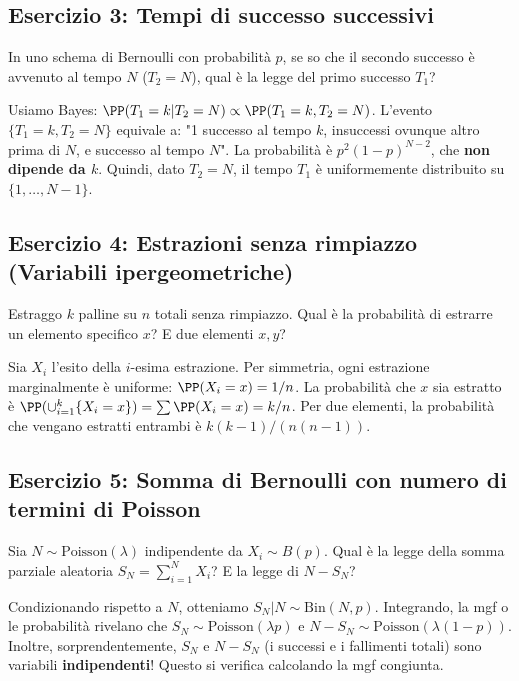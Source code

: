 \subsection*{Esercizio 3: Tempi di successo successivi}
In uno schema di Bernoulli con probabilità $p$, se so che il secondo successo è avvenuto al tempo $N$ ($T_2 = N$), qual è la legge del primo successo $T_1$?
\begin{spiegazione}
Usiamo Bayes: $\PP(T_1 = k | T_2 = N) \propto \PP(T_1 = k, T_2 = N)$.
L'evento $\{T_1 = k, T_2 = N\}$ equivale a: "1 successo al tempo $k$, insuccessi ovunque altro prima di $N$, e successo al tempo $N$". La probabilità è $p^2 (1-p)^{N-2}$, che \textbf{non dipende da $k$}.
Quindi, dato $T_2=N$, il tempo $T_1$ è uniformemente distribuito su $\{1, \dots, N-1\}$.
\end{spiegazione}

\subsection*{Esercizio 4: Estrazioni senza rimpiazzo (Variabili ipergeometriche)}
Estraggo $k$ palline su $n$ totali senza rimpiazzo. Qual è la probabilità di estrarre un elemento specifico $x$? E due elementi $x, y$?
\begin{spiegazione}
Sia $X_i$ l'esito della $i$-esima estrazione. Per simmetria, ogni estrazione marginalmente è uniforme: $\PP(X_i = x) = 1/n$.
La probabilità che $x$ sia estratto è $\PP(\cup_{i=1}^k \{X_i=x\}) = \sum \PP(X_i=x) = k/n$.
Per due elementi, la probabilità che vengano estratti entrambi è $k(k-1)/(n(n-1))$.
\end{spiegazione}

\subsection*{Esercizio 5: Somma di Bernoulli con numero di termini di Poisson}
Sia $N \sim \text{Poisson}(\lambda)$ indipendente da $X_i \sim B(p)$. Qual è la legge della somma parziale aleatoria $S_N = \sum_{i=1}^N X_i$? E la legge di $N - S_N$?
\begin{spiegazione}
Condizionando rispetto a $N$, otteniamo $S_N|N \sim \text{Bin}(N, p)$. Integrando, la mgf o le probabilità rivelano che \textbf{$S_N \sim \text{Poisson}(\lambda p)$} e \textbf{$N - S_N \sim \text{Poisson}(\lambda(1-p))$}.
Inoltre, sorprendentemente, $S_N$ e $N-S_N$ (i successi e i fallimenti totali) sono variabili \textbf{indipendenti}! Questo si verifica calcolando la mgf congiunta.
\end{spiegazione}

